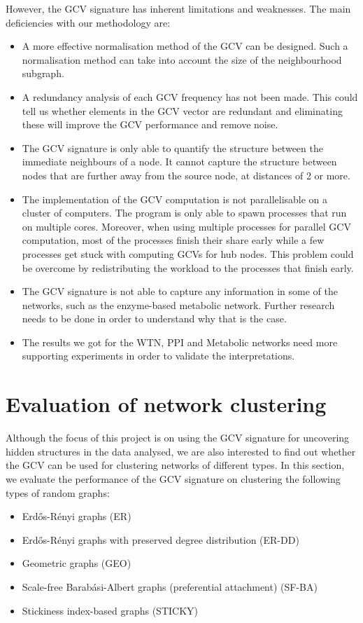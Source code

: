 However, the GCV signature has inherent limitations and weaknesses. The main deficiencies with our methodology are:
\begin{itemize}
 \item A more effective normalisation method of the GCV can be designed. Such a normalisation method can take into account the size of the neighbourhood subgraph.
 \item A redundancy analysis of each GCV frequency has not been made. This could tell us whether elements in the GCV vector are redundant and eliminating these will improve the GCV performance and remove noise.
 \item The GCV signature is only able to quantify the structure between the immediate neighbours of a node. It cannot capture the structure between nodes that are further away from the source node, at distances of 2 or more. 
 \item The implementation of the GCV computation is not parallelisable on a cluster of computers. The program is only able to spawn processes that run on multiple cores. Moreover, when using multiple processes for parallel GCV computation, most of the processes finish their share early while a few processes get stuck with computing GCVs for hub nodes. This problem could be overcome by redistributing the workload to the processes that finish early.
 \item The GCV signature is not able to capture any information in some of the networks, such as the enzyme-based metabolic network. Further research needs to be done in order to understand why that is the case.
 \item The results we got for the WTN, PPI and Metabolic networks need more supporting experiments in order to validate the interpretations. 
\end{itemize}


\section{Evaluation of network clustering}
\label{sec:eval_clust}

Although the focus of this project is on using the GCV signature for uncovering hidden structures in the data analysed, we are also interested to find out whether the GCV can be used for clustering networks of different types. In this section, we evaluate the performance of the GCV signature on clustering the following types of random graphs:
\begin{itemize}
 \item Erd\H{o}s-R\'{e}nyi graphs (ER)
 \item Erd\H{o}s-R\'{e}nyi graphs with preserved degree distribution (ER-DD)
 \item Geometric graphs (GEO)
 \item Scale-free Barab\'{a}si-Albert graphs (preferential attachment) (SF-BA)
 \item Stickiness index-based graphs (STICKY)
\end{itemize}

